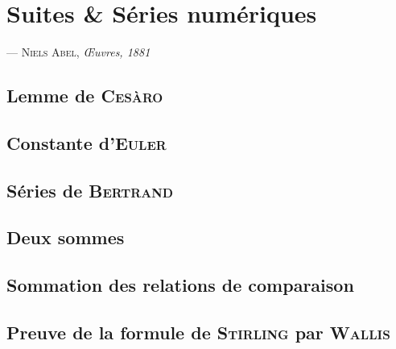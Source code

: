 \chapter{Suites \& Séries numériques}

\emph{}
\begin{flushright}
\textsc{--- Niels Abel}, \emph{Œuvres, 1881}
\end{flushright}

\newpage

\section{Lemme de \textsc{Cesàro}} \label{lemme_cesaro}


\section{Constante d'\textsc{Euler}}


\section{Séries de \textsc{Bertrand}}


\section{Deux sommes} \label{deux_sommes}


\section{Sommation des relations de comparaison} \label{sommation_relations_comparaison}


\section{Preuve de la formule de \textsc{Stirling} par \textsc{Wallis}}
\label{preuve_stirling}



